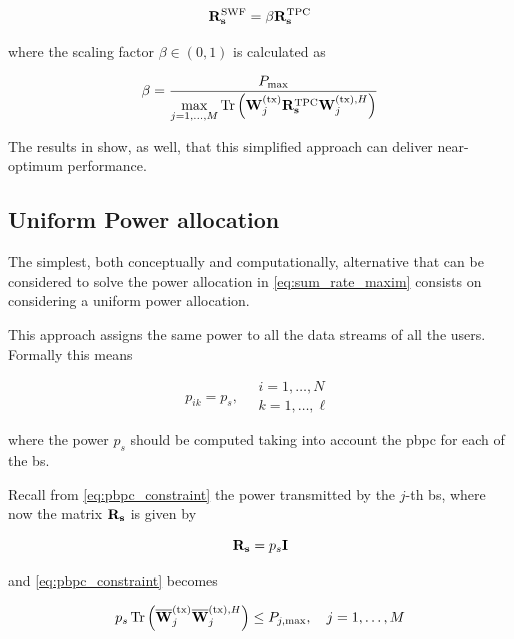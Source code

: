 \begin{equation} \label{eq:power_allocation_scaled}
    \mathbf{R}_{\mathbf{s}}^{\text{SWF}} = \beta \mathbf{R}_{\mathbf{s}}^{\text{TPC}}
\end{equation}

\noindent
where the scaling factor $\beta \in \left(0, 1\right)$ is calculated as

\begin{equation} \label{eq:scaling_factor}
    \beta = \frac{P_{\max}}{\max\limits_{j=1, \ldots, M} \operatorname*{Tr}\left(
    \mathbf{W}^{(\text{tx})}_j \mathbf{R}_{\mathbf{s}}^{\text{TPC}} \mathbf{W}^{(\text{tx}),H}_j \right)}
\end{equation}

The results in \cite{zhang09} show, as well, that this simplified approach can
deliver near-optimum performance.

\subsection{Uniform Power allocation}\label{ssec:uniform_allocation}

The simplest, both conceptually and computationally, alternative that can be
considered to solve the power allocation in \eqref{eq:sum_rate_maxim} consists
on considering a uniform power allocation.

This approach assigns the same power to all the data streams of all the
users. Formally this means

\begin{equation} \label{eq:equal_power}
    p_{ik} = p_{s}, \quad \begin{array}{l}
        i = 1, \ldots, N \\
        k = 1, \ldots, \ell
    \end{array}
\end{equation}

\noindent
where the power $p_s$ should be computed taking into account the \gls{pbpc} for
each of the \gls{bs}.

Recall from \eqref{eq:pbpc_constraint} the power transmitted by the $j$-th
\gls{bs}, where now the matrix $\mathbf{R}_{\mathbf{s}}$ is given by

\begin{equation} \label{eq:rs_equal}
    \mathbf{R}_{\mathbf{s}} = p_s \mathbf{I}
\end{equation}

\noindent
and \eqref{eq:pbpc_constraint} becomes

\begin{equation} \label{eq:pbpc_equal}
    p_s \operatorname*{Tr} \left( \mathbf{\overline{W}}^{(\text{tx})}_j \mathbf{\overline{W}}^{(\text{tx}),H}_j \right) \leq P_{j, \max}, \quad
    j = 1, \ldots, M
\end{equation}

